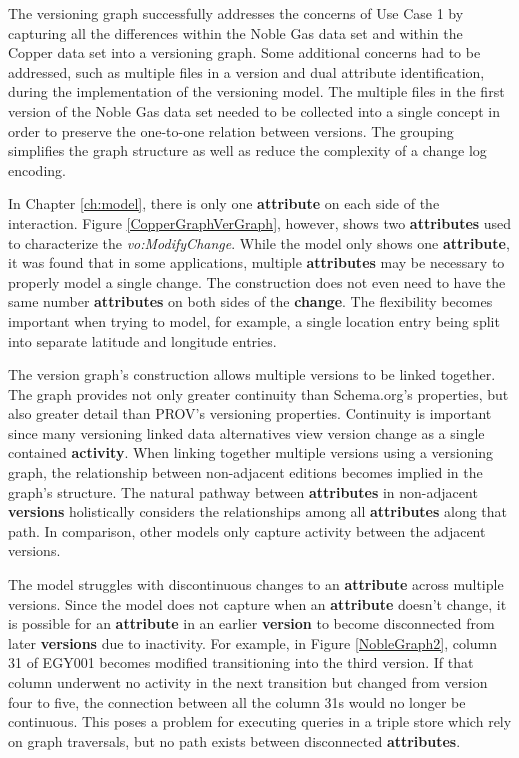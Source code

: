 The versioning graph successfully addresses the concerns of Use Case 1 by capturing all the differences within the Noble Gas data set and within the Copper data set into a versioning graph.
Some additional concerns had to be addressed, such as multiple files in a version and dual attribute identification, during the implementation of the versioning model.
The multiple files in the first version of the Noble Gas data set needed to be collected into a single concept in order to preserve the one-to-one relation between versions.
The grouping simplifies the graph structure as well as reduce the complexity of a change log encoding.

In Chapter \ref{ch:model}, there is only one \textbf{attribute} on each side of the interaction.
Figure \ref{CopperGraphVerGraph}, however, shows two \textbf{attributes} used to characterize the \textit{vo:ModifyChange}.
While the model only shows one \textbf{attribute}, it was found that in some applications, multiple \textbf{attributes} may be necessary to properly model a single change.
The construction does not even need to have the same number \textbf{attributes} on both sides of the \textbf{change}.
The flexibility becomes important when trying to model, for example, a single location entry being split into separate latitude and longitude entries.

The version graph's construction allows multiple versions to be linked together.
The graph provides not only greater continuity than Schema.org's properties, but also greater detail than PROV's versioning properties.
Continuity is important since many versioning linked data alternatives view version change as a single contained \textbf{activity}.
When linking together multiple versions using a versioning graph, the relationship between non-adjacent editions becomes implied in the graph's structure.
The natural pathway between \textbf{attributes} in non-adjacent \textbf{versions} holistically considers the relationships among all \textbf{attributes} along that path.
In comparison, other models only capture activity between the adjacent versions.

The model struggles with discontinuous changes to an \textbf{attribute} across multiple versions.
Since the model does not capture when an \textbf{attribute} doesn't change, it is possible for an \textbf{attribute} in an earlier \textbf{version} to become disconnected from later \textbf{versions} due to inactivity.
For example, in Figure \ref{NobleGraph2}, column 31 of EGY001 becomes modified transitioning into the third version.
If that column underwent no activity in the next transition but changed from version four to five, the connection between all the column 31s would no longer be continuous.
This poses a problem for executing queries in a triple store which rely on graph traversals, but no path exists between disconnected \textbf{attributes}.

